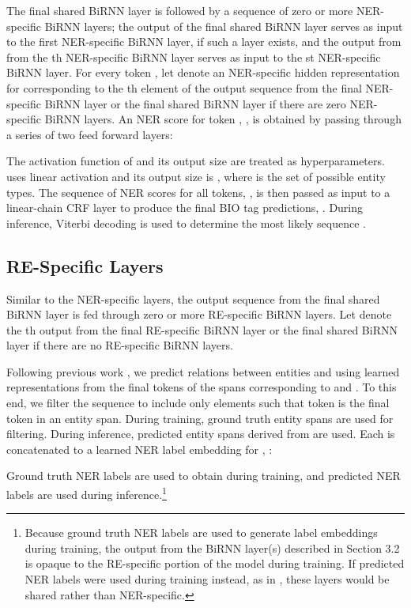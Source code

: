 \documentclass{article}
\begin{document}
The final shared BiRNN layer is followed by a sequence of zero or more NER-specific BiRNN layers; the output of the final shared BiRNN layer serves as input to the first NER-specific BiRNN layer, if such a layer exists, and the output from from the th NER-specific BiRNN layer serves as input to the st NER-specific BiRNN layer. For every token , let  denote an NER-specific hidden representation for  corresponding to the th element of the output sequence from the final NER-specific BiRNN layer or the final shared BiRNN layer if there are zero NER-specific BiRNN layers. An NER score for token , , is obtained by passing  through a series of two feed forward layers:

The activation function of  and its output size are treated as hyperparameters.  uses linear activation and its output size is , where  is the set of possible entity types. The sequence of NER scores for all tokens, , is then passed as input to a linear-chain CRF layer to produce the final BIO tag predictions, . During inference, Viterbi decoding is used to determine the most likely sequence .

\subsection{RE-Specific Layers}

Similar to the NER-specific layers, the output sequence from the final shared BiRNN layer is fed through zero or more RE-specific BiRNN layers. Let  denote the th output from the final RE-specific BiRNN layer or the final shared BiRNN layer if there are no RE-specific BiRNN layers. 

Following previous work \cite{gupta-etal-2016-table,bekoulis2018joint,nguyen2019end}, we predict relations between entities  and  using learned representations from the final tokens of the spans corresponding to  and . To this end, we filter the sequence  to include only elements  such that token  is the final token in an entity span. During training, ground truth entity spans are used for filtering. During inference, predicted entity spans derived from  are used. Each  is concatenated to a learned NER label embedding for , :

Ground truth NER labels are used to obtain  during training, and predicted NER labels are used during inference.\footnote{Because ground truth NER labels are used to generate label embeddings during training, the output from the BiRNN layer(s) described in Section 3.2 is opaque to the RE-specific portion of the model during training. If predicted NER labels were used during training instead, as in \cite{nguyen2019end}, these layers would be shared rather than NER-specific.}
\end{document}
